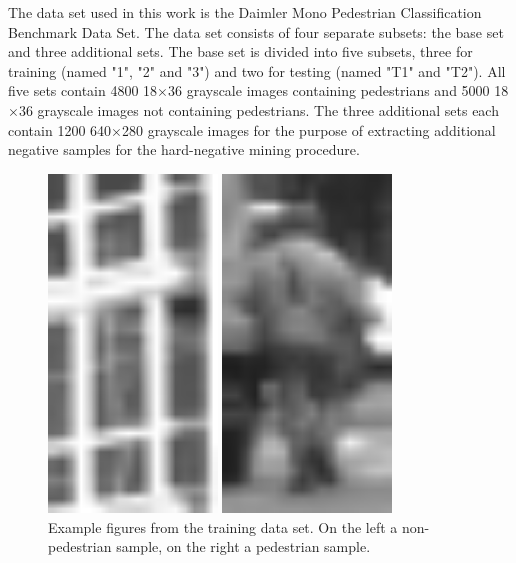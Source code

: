 \documentclass[journal,twocolumn]{IEEEtran}
\begin{document}
The data set used in this work is the Daimler Mono Pedestrian Classification Benchmark Data Set\cite{3}. The data set consists of four separate subsets: the base set and three additional sets. The base set is divided into five subsets, three for training (named "1", "2" and "3") and two for testing (named "T1" and "T2"). All five sets contain 4800 18$\times$36 grayscale images containing pedestrians and 5000 18$\times$36 grayscale images not containing pedestrians. The three additional sets each contain 1200 640$\times$280 grayscale images for the purpose of extracting additional negative samples for the hard-negative mining procedure.

\begin{figure}[h]
\begin{minipage}{0.45\columnwidth}
\centering
\includegraphics[keepaspectratio,width=0.4\textwidth]{1}
\end{minipage}
\begin{minipage}{0.45\columnwidth}
\centering
\includegraphics[keepaspectratio,width=0.4\textwidth]{2}
\end{minipage}
\caption[Example images from the dataset]{Example figures from the training data set. On the left a non-pedestrian sample, on the right a pedestrian sample.}
\end{figure}
\end{document}
